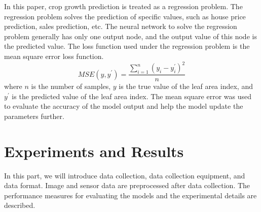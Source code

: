 \documentclass[acmsmall,manuscript, screen, review]{acmart}
\begin{document}
In this paper, crop growth prediction is treated as a regression problem. The regression problem solves the prediction of specific values, such as house price prediction, sales prediction, etc. The neural network to solve the regression problem generally has only one output node, and the output value of this node is the predicted value. The loss function used under the regression problem is the mean square error loss function.
\begin{equation}
  MSE\left(y,y^\prime\right)=\frac{\sum_{i=1}^{n}\left(y_i-y_i^\prime\right)^2}{n}
\end{equation}
where \begin{math}
  n
\end{math} is the number of samples, \begin{math}
  y
\end{math} is the true value of the leaf area index, and \begin{math}
  y^\prime
\end{math} is the predicted value of the leaf area index. The mean square error was used to evaluate the accuracy of the model output and help the model update the parameters further.
\section{Experiments and Results}
In this part, we will introduce data collection, data collection equipment, and data format. Image and sensor data are preprocessed after data collection. The performance measures for evaluating the models and the experimental details are described.
\end{document}
